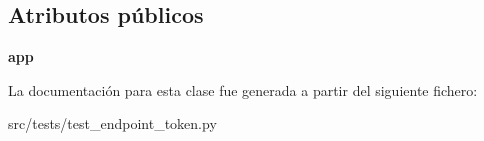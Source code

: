 \subsection*{Atributos públicos}
\begin{DoxyCompactItemize}
\item 
\hypertarget{classsrc_1_1tests_1_1test__endpoint__token_1_1_test_endpoint_token_a35501d42c2a4197c00f7e3ccbf40ee64}{{\bfseries app}}\label{classsrc_1_1tests_1_1test__endpoint__token_1_1_test_endpoint_token_a35501d42c2a4197c00f7e3ccbf40ee64}

\end{DoxyCompactItemize}


La documentación para esta clase fue generada a partir del siguiente fichero\-:\begin{DoxyCompactItemize}
\item 
src/tests/test\-\_\-endpoint\-\_\-token.\-py\end{DoxyCompactItemize}
